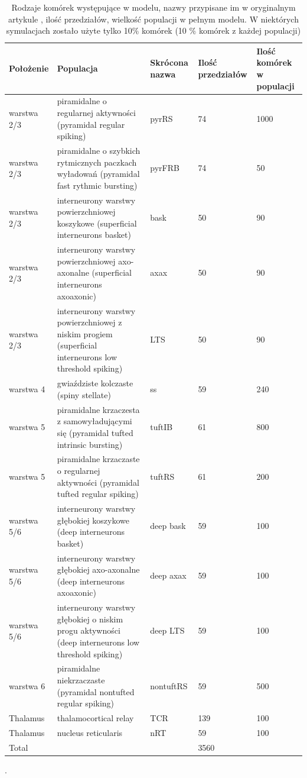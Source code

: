 \begin{table}[h!]
  \begin{tabular}{|p{}|p{}|p{}|p{}|p{}|}
    \hline
    Położenie & Populacja & Skrócona nazwa & Ilość przedziałów & Ilość komórek w populacji\\
    \hline
    warstwa 2/3 & piramidalne o regularnej aktywności (pyramidal regular spiking) & pyrRS & 74 & 1000 \\
    \hline
    warstwa 2/3 & piramidalne o szybkich rytmicznych paczkach wyładowań (pyramidal fast rythmic bursting) & pyrFRB & 74  & 50 \\
    \hline
    warstwa 2/3 & interneurony warstwy powierzchniowej koszykowe (superficial interneurons basket) & bask & 50 & 90 \\
    \hline
    warstwa 2/3 & interneurony warstwy powierzchniowej axo-axonalne (superficial interneurons axoaxonic) & axax & 50 & 90 \\
    \hline
    warstwa 2/3 & interneurony warstwy powierzchniowej z niskim progiem (superficial interneurons low threshold spiking) & LTS & 50 & 90 \\
    \hline
    warstwa 4 & gwiaździste kolczaste (spiny stellate) & ss & 59 & 240 \\
    \hline
    warstwa 5 & piramidalne krzaczesta z samowyładującymi się (pyramidal tufted intrinsic bursting) & tuftIB & 61 & 800 \\
    \hline
    warstwa 5 &  piramidalne krzaczaste o regularnej aktywności (pyramidal tufted regular spiking) & tuftRS & 61 & 200\\
    \hline
    warstwa 5/6 & interneurony warstwy głębokiej koszykowe (deep interneurons basket) & deep bask & 59 & 100 \\
    \hline
    warstwa 5/6 & interneurony warstwy głębokiej axo-axonalne (deep interneurons axoaxonic) & deep axax & 59 & 100 \\
    \hline
    warstwa 5/6 & interneurony warstwy głębokiej o niskim progu aktywności (deep interneurons low threshold spiking) & deep LTS & 59 & 100 \\
    \hline
    warstwa  6 & piramidalne niekrzaczaste (pyramidal nontufted regular spiking) & nontuftRS & 59 & 500\\
    \hline
    Thalamus & thalamocortical relay & TCR & 139 & 100 \\
    \hline
    Thalamus & nucleus reticularis & nRT & 59 & 100 \\
    \hline
    Total & & & 3560 \\
    \hline
  \end{tabular}
  \caption{Rodzaje komórek występujące w modelu, nazwy przypisane im w oryginalnym artykule \cite{Traub2005}, ilość przedziałów, wielkość populacji
w pełnym modelu. W niektórych symulacjach zostało użyte tylko 10$\%$ komórek (10 $\%$ komórek z każdej populacji)}.
  \label{tab:pop}
\end{table}

